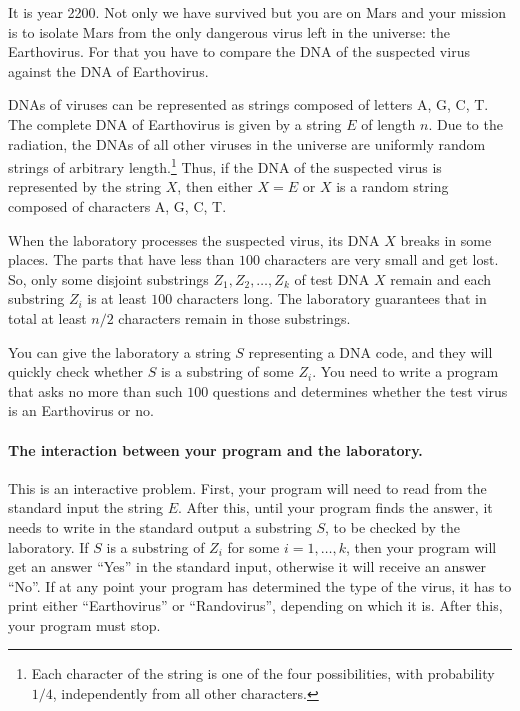 It is year 2200.
Not only we have survived but you are on Mars and your mission is to isolate Mars from the only dangerous virus left in the universe: the Earthovirus.
For that you have to compare the DNA of the suspected virus against the DNA of Earthovirus.

DNAs of viruses can be represented as strings composed of letters A, G, C, T.
The complete DNA of Earthovirus is given by a string $E$ of length $n$.
Due to the radiation, the DNAs of all other viruses in the universe are uniformly random strings of arbitrary length.\footnote{Each character of the string is one of the four possibilities, with probability $1/4$, independently from all other characters.}
Thus, if the DNA of the suspected virus is represented by the string $X$, then either $X = E$ or $X$ is a random string composed of characters A, G, C, T.

When the laboratory processes the suspected virus, its DNA $X$ breaks in some places. %
The parts that have less than $100$ characters are very small and get lost.
So, only some disjoint substrings $Z_1, Z_2, \dots, Z_k$ of test DNA $X$ remain and each substring $Z_i$ is at least $100$ characters long.
The laboratory guarantees that in total at least $n / 2$ characters remain in those substrings.

You can give the laboratory a string $S$ representing a DNA code, and they will quickly check whether $S$ is a substring of some $Z_i$.
You need to write a program that asks no more than such $100$ questions and determines whether the test virus is an Earthovirus or no.

\paragraph{The interaction between your program and the laboratory.}
This is an interactive problem.
First, your program will need to read from the standard input the string $E$.
After this, until your program finds the answer, it needs to write in the standard output a substring $S$, to be checked by the laboratory.
If $S$ is a substring of $Z_i$ for some $i = 1, \dots, k$, then your program will get an answer ``Yes'' in the standard input, otherwise it will receive an answer ``No''.
If at any point your program has determined the type of the virus, it has to print either ``Earthovirus'' or ``Randovirus'', depending on which it is.
After this, your program must stop.

